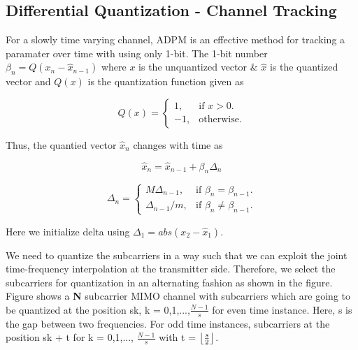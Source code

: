 \documentclass[conference]{IEEEtran}
\DeclarePairedDelimiter\floor{\lfloor}{\rfloor}
\begin{document}


  

\subsection{Differential Quantization - Channel Tracking} 
\label{quantiz} 

For a slowly time varying channel, ADPM is an effective method for tracking a paramater over time with using only 1-bit. The 1-bit number $\beta_{n} = Q(x_{n} - \hat{x}_{n-1})$ where $x$ is the unquantized vector $\&$ $\hat{x}$ is the quantized vector and $Q(x)$ is the quantization function given as 

  

\begin{equation}
  Q(x)=\begin{cases}
    1, & \text{if $x>0$}.\\
    -1, & \text{otherwise}.
  \end{cases}
\end{equation}

Thus, the quantied vector $\hat{x}_n$ changes with time as 

\begin{equation} 
\hat{x}_{n} = \hat{x}_{n-1} + \beta_{n}\Delta_{n} 
\end{equation} 

\begin{equation}
\label{delta_eqn}
\Delta_{n} = \begin{cases} 
    M \Delta_{n-1}, & \text{if $\beta_{n} = \beta_{n-1}$}.\\ 
    \Delta_{n-1}/m , & \text{if $\beta_{n} \neq \beta_{n-1}$}. 
  \end{cases} 
\end{equation} 

Here we initialize delta using $\Delta_1 = abs(x_{2}-\hat{x}_1)$.

We need to quantize the subcarriers in a way such that we can exploit the joint time-frequency interpolation at the transmitter side. Therefore, we select the subcarriers for quantization in an alternating fashion as shown in the figure. Figure shows a \textbf{N} subcarrier MIMO channel with subcarriers which are going to be quantized at the position sk, k = 0,1,...,$\frac{N-1}{s}$ for even time instance. Here, s is the gap between two frequencies. For odd time instances, subcarriers at the position sk + t for k = 0,1,..., $\frac{N-1}{s}$ with t = $\floor*{\frac{s}{2}}$. 
\end{document}
